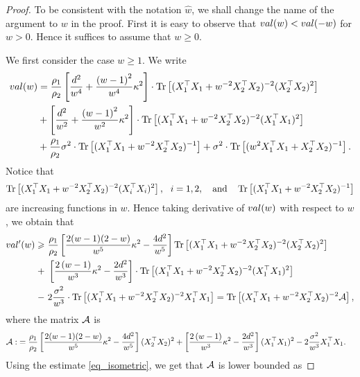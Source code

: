 \begin{proof}
To be consistent with the notation $\hat w$, we shall change the name of the argument to $w$ in the proof. First it is easy to observe that $\val(w)< \val(-w)$ for $w> 0$. Hence it suffices to assume that $w\ge 0$.

We first consider the case $w\ge 1$. We write
\begin{align}
	\val(w) &=  \frac{\rho_1}{\rho_2}\left[\frac{d^2}{w^4} +\frac{\left( w-1\right)^2}{w^4}\kappa^2\right]\cdot \tr\left[( X_1^{\top}X_1 +w^{-2}X_2^{\top}X_2)^{-2} (X_2^{\top}X_2)^2\right] \nonumber \\
	& + \left[\frac{d^2}{w^2} +\frac{\left( w-1\right)^2}{w^2}\kappa^2\right]\cdot \tr\left[( X_1^{\top}X_1 +w^{-2}X_2^{\top}X_2)^{-2} (X_1^{\top}X_1)^2\right] \nonumber\\
			& +  \frac{\rho_1}{\rho_2}\sigma^2  \cdot \bigtr{(X_1^{\top}X_1  + w^{-2}X_2^{\top}X_2)^{-1} }+ \sigma^2 \cdot \bigtr{(w^2X_1^{\top}X_1  + X_2^{\top}X_2)^{-1} }.\nonumber%
\end{align}
Notice that 
$$\tr\left[( X_1^{\top}X_1 +w^{-2}X_2^{\top}X_2)^{-2} (X_i^{\top}X_i)^2\right],\ \ i=1,2, \quad \text{and} \quad \bigtr{(X_1^{\top}X_1  + w^{-2}X_2^{\top}X_2)^{-1} }$$
are increasing functions in $w$. Hence taking derivative of $\val(w)$ with respect to $w$, we obtain that
\begin{align*}
\val'(w) \ge &~  \frac{\rho_1}{\rho_2}\left[ \frac{2(w-1)(2-w)}{w^5}\kappa^2 - \frac{4d^2}{w^5}\right] \tr\left[( X_1^{\top}X_1 +w^{-2}X_2^{\top}X_2)^{-2} (X_2^{\top}X_2)^2\right]   \\
+&~ \left[\frac{2\left( w-1\right)}{w^3}\kappa^2 - \frac{2d^2}{w^3} \right]\cdot \tr\left[( X_1^{\top}X_1 +w^{-2}X_2^{\top}X_2)^{-2} (X_1^{\top}X_1)^2\right] \nonumber\\
		-&~ 2  \frac{\sigma^2}{w^3} \cdot \bigtr{(X_1^{\top}X_1 + w^{-2}X_2^{\top}X_2)^{-2} X_1^\top X_1  } =  \bigtr{(X_1^{\top}X_1 + w^{-2}X_2^{\top}X_2)^{-2} \cal A },
\end{align*}
where the matrix $\cal A$ is
\begin{align*}
\cal A :&= \frac{\rho_1}{\rho_2}\left[ \frac{2(w-1)(2-w)}{w^5}\kappa^2 - \frac{4d^2}{w^5}\right](X_2^{\top}X_2)^2 + \left[\frac{2\left( w-1\right)}{w^3}\kappa^2 - \frac{2d^2}{w^3} \right](X_1^{\top}X_1)^2 - 2 \frac{\sigma^2}{w^3}X_1^\top X_1.
\end{align*}
Using the estimate \eqref{eq_isometric}, we get that $\cal A$ is lower bounded as

\end{proof}
